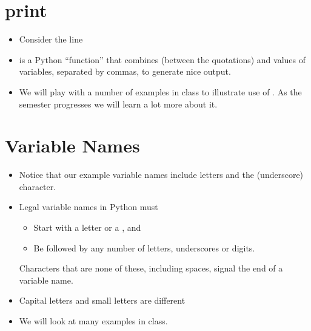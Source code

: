 \documentclass[letterpaper,10pt,english]{sphinxmanual}
\begin{document}
\section{print}
\label{\detokenize{lecture_notes/lec02_calculator:print}}\begin{itemize}
\item {} 
Consider the line

%
\begin{sphinxVerbatim}[commandchars=\\\{\}]
   
\end{sphinxVerbatim}

\item {} 
is a Python “function” that combines  (between the
quotations) and values of variables, separated by commas, to
generate nice output.

\item {} 
We will play with a number of examples in class to illustrate use
of .  As the semester progresses we will learn a lot more
about it.

\end{itemize}


\section{Variable Names}
\label{\detokenize{lecture_notes/lec02_calculator:variable-names}}\begin{itemize}
\item {} 
Notice that our example variable names include letters and the \sphinxcode{\sphinxupquote{\_}}
(underscore) character.

\item {} 
Legal variable names in Python must
\begin{itemize}
\item {} 
Start with a letter or a \sphinxcode{\sphinxupquote{\_}}, and

\item {} 
Be followed by any number of letters, underscores or digits.

\end{itemize}

Characters that are none of these, including spaces, signal the end
of a variable name.

\item {} 
Capital letters and small letters are different

\item {} 
We will look at many examples in class.

\end{itemize}
\end{document}
